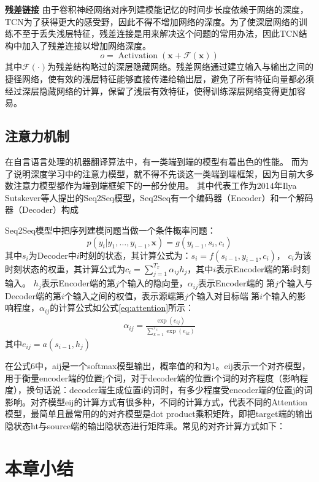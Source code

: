 \textbf{残差链接}
由于卷积神经网络对序列建模能记忆的时间步长度依赖于网络的深度，TCN为了获得更大的感受野，因此不得不增加网络的深度。为了使深层网络的训练不至于丢失浅层特征，残差连接是用来解决这个问题的常用办法，因此TCN结构中加入了残差连接以增加网络深度。
$$
  o=\operatorname{Activation}(\mathbf{x}+\mathcal{F}(\mathbf{x}))
$$
其中$\mathcal{F}(\cdot)$为残差结构略过的深层隐藏网络。残差网络通过建立输入与输出之间的捷径网络，使有效的浅层特征能够直接传递给输出层，避免了所有特征向量都必须经过深层隐藏网络的计算，保留了浅层有效特征，使得训练深层网络变得更加容易。



\subsection{注意力机制}
在自言语言处理的机器翻译算法中，有一类端到端的模型有着出色的性能。
而为了说明深度学习中的注意力模型，就不得不先谈这一类端到端框架，因为目前大多数注意力模型都作为端到端框架下的一部分使用。
其中代表工作为2014年Ilya Sutskever等人提出的Seq2Seq\cite{DBLP:journals/corr/GehringAGYD17}模型，Seq2Seq有一个编码器（Encoder）和一个解码器（Decoder）构成

Seq2Seq模型中把序列建模问题当做一个条件概率问题：
$$
  p\left(y_{i} | y_{1}, \ldots, y_{i-1}, \mathbf{x}\right)=g\left(y_{i-1}, s_{i}, c_{i}\right)
$$
其中$s_{i}$为Decoder中$i$时刻的状态，其计算公式为：$s_{i}=f\left(s_{i-1}, y_{i-1}, c_{i}\right)$，
$c_{i}$为该时刻状态的权重，其计算公式为$c_{i}=\sum_{j=1}^{T_{x}} \alpha_{ij} h_{j}$，其中$i$表示Encoder端的第$i$时刻输入。
$h_{j}$表示Encoder端的第$j$个输入的隐向量，$\alpha_{i j}$表示Encoder端的%
第$j$个输入与Decoder端的第$i$个输入之间的权值，表示源端第$j$个输入对目标端%
第$i$个输入的影响程度，$\alpha_{i j}$的计算公式如公式\ref{eq:attention}所示：
\begin{align}
  \alpha_{i j}=\frac{\exp \left(e_{i j}\right)}{\sum_{k=1}^{T_{x}} \exp \left(e_{i k}\right)} \label{attention}
\end{align} 
其中$e_{i j}=a\left(s_{i-1}, h_{j}\right)$

在公式6中，aij是一个softmax模型输出，概率值的和为1。eij表示一个对齐模型，用于衡量encoder端的位置j个词，对于decoder端的位置i个词的对齐程度（影响程度），换句话说：decoder端生成位置i的词时，有多少程度受encoder端的位置j的词影响。对齐模型eij的计算方式有很多种，不同的计算方式，代表不同的Attention模型，最简单且最常用的的对齐模型是dot product乘积矩阵，即把target端的输出隐状态ht与source端的输出隐状态进行矩阵乘。常见的对齐计算方式如下：


\section{本章小结}

